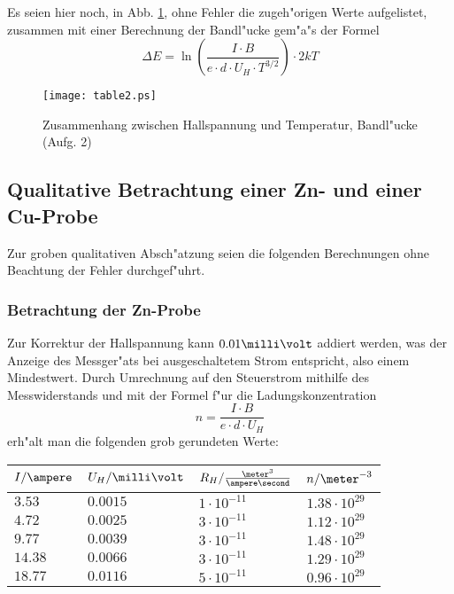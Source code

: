 \documentclass[a4paper,10pt]{article}
\begin{document}
Es seien hier noch, in Abb. \ref{table2}, ohne Fehler die zugeh"origen Werte aufgelistet, zusammen mit einer Berechnung der Bandl"ucke gem"a"s der Formel
\begin{equation}
\Delta E = \ln \left( \frac{I \cdot B}{e \cdot d \cdot U_H \cdot T^{3/2}} \right) \cdot 2kT
\end{equation}
\begin{figure}[p]
    \centering
    \texttt{[image: table2.ps]}
\caption{Zusammenhang zwischen Hallspannung und Temperatur, Bandl"ucke (Aufg. 2)}
\label{table2}
\end{figure}


\subsection{Qualitative Betrachtung einer Zn- und einer Cu-Probe}
Zur groben qualitativen Absch"atzung seien die folgenden Berechnungen ohne Beachtung der Fehler durchgef"uhrt.

\subsubsection*{Betrachtung der Zn-Probe}
Zur Korrektur der Hallspannung kann $0.01 \milli\volt$ addiert werden, was der Anzeige des Messger"ats bei ausgeschaltetem Strom entspricht, also einem Mindestwert. Durch Umrechnung auf den Steuerstrom mithilfe des Messwiderstands und mit der Formel f"ur die Ladungskonzentration
\begin{equation}
n=\frac{I \cdot B}{e \cdot d \cdot U_H}
\end{equation}
erh"alt man die folgenden grob gerundeten Werte:
\begin{center}
\begin{tabular}{|l|l|l|l|}
\hline
$I / \ampere$ & $U_H / \milli\volt$ & $R_H / \frac{\meter^3}{\ampere \second}$ & $n / \meter^{-3}$ \\
\hline
$3.53$ & $0.0015$ & $1 \cdot 10^{-11}$ & $1.38 \cdot 10^{29}$ \\
$4.72$ & $0.0025$ & $3 \cdot 10^{-11}$ & $1.12 \cdot 10^{29}$ \\
$9.77$ & $0.0039$ & $3 \cdot 10^{-11}$ & $1.48 \cdot 10^{29}$ \\
$14.38$ & $0.0066$ & $3 \cdot 10^{-11}$ & $1.29 \cdot 10^{29}$ \\
$18.77$ & $0.0116$ & $5 \cdot 10^{-11}$ & $0.96 \cdot 10^{29}$\\
\hline
\end{tabular}
\end{center}
\end{document}
